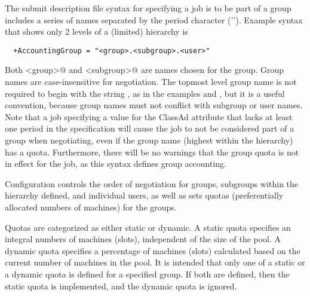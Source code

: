 The submit description file syntax for specifying a job is to be
part of a group includes 
a series of names separated by the period character ('').
Example syntax that shows only 2 levels of a (limited) hierarchy is
\begin{verbatim}
  +AccountingGroup = "<group>.<subgroup>.<user>"
\end{verbatim}
Both \verb@<group>@ and \verb@<subgroup>@ are names chosen for the group.
Group names are case-insensitive for negotiation.
The topmost level group name is not required to begin with the
string ,
as in the examples
 and ,
but it is a useful convention,
because group names must not conflict with subgroup or user names.
Note that a job specifying a value for the 
ClassAd attribute that lacks at least one period in the specification
will cause the job to not be considered part of a
group when negotiating, even if the group name 
(highest within the hierarchy) has a quota.
Furthermore, there will be no warnings that the group quota is not
in effect for the job, as this syntax defines group accounting.

Configuration controls the order of negotiation for
groups, subgroups within the hierarchy defined, and individual users,
as well as sets quotas
(preferentially allocated numbers of machines)
for the groups.

Quotas are categorized as either static or dynamic.
A static quota specifies an integral numbers of machines (slots),
independent of the size of the pool.
A dynamic quota specifies a percentage of machines (slots) calculated
based on the current number of machines in the pool.
It is intended that only one of a static or a dynamic quota is defined 
for a specified group.
If both are defined, then the static quota is implemented, 
and the dynamic quota is ignored.

